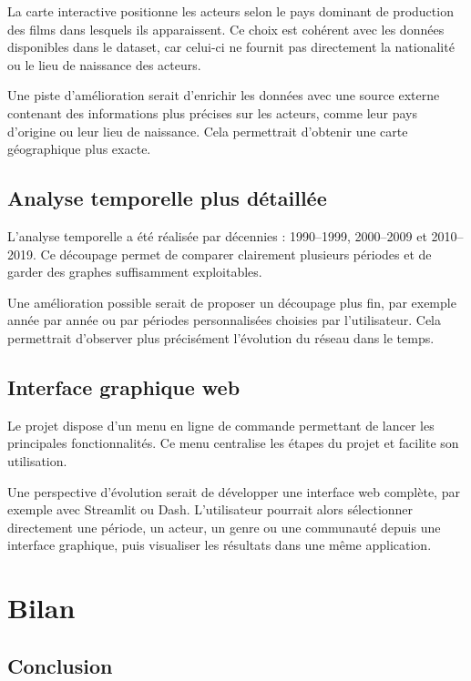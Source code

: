 \documentclass[11pt,a4paper,oneside,openany]{report}
\begin{document}
La carte interactive positionne les acteurs selon le pays dominant de production des films dans lesquels ils apparaissent. Ce choix est cohérent avec les données disponibles dans le dataset, car celui-ci ne fournit pas directement la nationalité ou le lieu de naissance des acteurs.

Une piste d’amélioration serait d’enrichir les données avec une source externe contenant des informations plus précises sur les acteurs, comme leur pays d’origine ou leur lieu de naissance. Cela permettrait d’obtenir une carte géographique plus exacte.

\section{Analyse temporelle plus détaillée}

L’analyse temporelle a été réalisée par décennies : 1990--1999, 2000--2009 et 2010--2019. Ce découpage permet de comparer clairement plusieurs périodes et de garder des graphes suffisamment exploitables.

Une amélioration possible serait de proposer un découpage plus fin, par exemple année par année ou par périodes personnalisées choisies par l’utilisateur. Cela permettrait d’observer plus précisément l’évolution du réseau dans le temps.

\section{Interface graphique web}

Le projet dispose d’un menu en ligne de commande permettant de lancer les principales fonctionnalités. Ce menu centralise les étapes du projet et facilite son utilisation.

Une perspective d’évolution serait de développer une interface web complète, par exemple avec Streamlit ou Dash. L’utilisateur pourrait alors sélectionner directement une période, un acteur, un genre ou une communauté depuis une interface graphique, puis visualiser les résultats dans une même application.

\chapter{Bilan}

\section{Conclusion}
\end{document}
